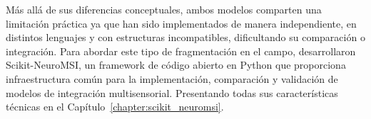 Más allá de sus diferencias conceptuales, ambos modelos comparten una limitación práctica ya que han sido implementados de manera independiente, en distintos lenguajes y con estructuras incompatibles, dificultando su comparación o integración. Para abordar este tipo de fragmentación en el campo, \citet{paredes2025scikit} desarrollaron Scikit-NeuroMSI, un framework de código abierto en Python que proporciona infraestructura común para la implementación, comparación y validación de modelos de integración multisensorial. Presentando todas sus características técnicas en el Capítulo~\ref{chapter:scikit_neuromsi}.






